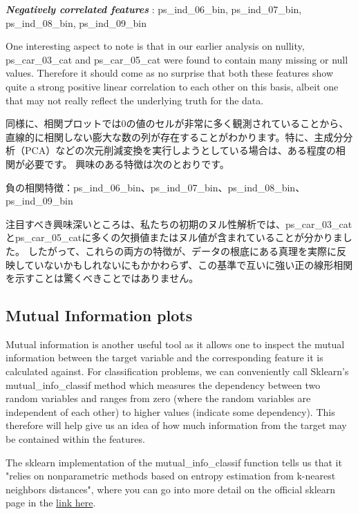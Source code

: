 \documentclass[11pt]{article}
\begin{document}
\textbf{\emph{Negatively correlated features}} : ps\_ind\_06\_bin,
ps\_ind\_07\_bin, ps\_ind\_08\_bin, ps\_ind\_09\_bin

One interesting aspect to note is that in our earlier analysis on
nullity, ps\_car\_03\_cat and ps\_car\_05\_cat were found to contain
many missing or null values. Therefore it should come as no surprise
that both these features show quite a strong positive linear correlation
to each other on this basis, albeit one that may not really reflect the
underlying truth for the data.

    同様に、相関プロットでは0の値のセルが非常に多く観測されていることから、直線的に相関しない膨大な数の列が存在することがわかります。特に、主成分分析（PCA）などの次元削減変換を実行しようとしている場合は、ある程度の相関が必要です。
興味のある特徴は次のとおりです。

負の相関特徴：ps\_ind\_06\_bin、ps\_ind\_07\_bin、ps\_ind\_08\_bin、ps\_ind\_09\_bin

注目すべき興味深いところは、私たちの初期のヌル性解析では、ps\_car\_03\_catとps\_car\_05\_catに多くの欠損値またはヌル値が含まれていることが分かりました。
したがって、これらの両方の特徴が、データの根底にある真理を実際に反映していないかもしれないにもかかわらず、この基準で互いに強い正の線形相関を示すことは驚くべきことではありません。

    \subsection{Mutual Information plots}\label{mutual-information-plots}

Mutual information is another useful tool as it allows one to inspect
the mutual information between the target variable and the corresponding
feature it is calculated against. For classification problems, we can
conveniently call Sklearn's mutual\_info\_classif method which measures
the dependency between two random variables and ranges from zero (where
the random variables are independent of each other) to higher values
(indicate some dependency). This therefore will help give us an idea of
how much information from the target may be contained within the
features.

The sklearn implementation of the mutual\_info\_classif function tells
us that it "relies on nonparametric methods based on entropy estimation
from k-nearest neighbors distances", where you can go into more detail
on the official sklearn page in the
\href{http://scikit-learn.org/stable/modules/generated/sklearn.feature_selection.mutual_info_classif.html\#sklearn.feature_selection.mutual_info_classif}{link
here}.
\end{document}
